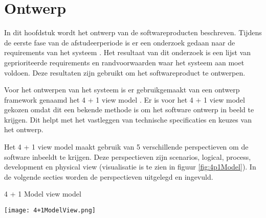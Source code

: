 \chapter{Ontwerp}
In dit hoofdstuk wordt het ontwerp van de softwareproducten beschreven.
Tijdens de eerste fase van de afstudeerperiode is er een onderzoek gedaan naar de requirements van het systeem \parencite{DanteOnderzoek}.
Het resultaat van dit onderzoek is een lijst van geprioriteerde requirements en randvoorwaarden waar het systeem aan moet voldoen.
Deze resultaten zijn gebruikt om het softwareproduct te ontwerpen.

\whitespace
Voor het ontwerpen van het systeem is er gebruikgemaakt van een ontwerp framework genaamd het 4 + 1 view model \parencite{4p1Model}.
Er is voor het 4 + 1 view model gekozen omdat dit een bekende methode is om het software ontwerp in beeld te krijgen.
Dit helpt met het vastleggen van technische specificaties en keuzes van het ontwerp.

\whitespace
Het 4 + 1 view model maakt gebruik van 5 verschillende perspectieven om de software inbeeldt te krijgen.
Deze perspectieven zijn scenarios, logical, process, development en physical view (visualisatie is te zien in figuur \ref{fig:4p1Model}).
In de volgende secties worden de perspectieven uitgelegd en ingevuld.

\whitespace[2]
\begin{graphic}
	\captionsetup{type=figure}
	\caption{4 + 1 Model view model \parencite{4p1Model} }
	\texttt{[image: 4+1ModelView.png]}
	\label{fig:4p1Model}
\end{graphic}

\newpage

\newpage


\newpage


\newpage

\newpage

